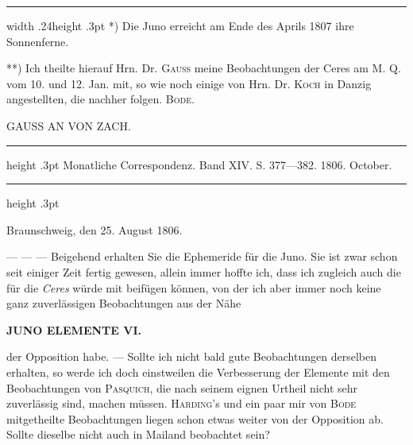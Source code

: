 \par\nobreak\smallskip
\begingroup
\footnotesize
\hrule width .24\linewidth height .3pt\relax
\smallskip
\noindent\hspace*{1.2em}\hypertarget{native-284-note-1}{}*) Die Juno erreicht am Ende des Aprils 1807 ihre Sonnenferne.\par\nobreak
\noindent\hspace*{1.2em}\hypertarget{native-284-note-2}{}**) Ich theilte hierauf Hrn. Dr. \textsc{Gauss} meine Beobachtungen der Ceres am M. Q. vom 10. und 12. Jan. mit, so wie noch einige von Hrn. Dr. \textsc{Koch} in Danzig angestellten, die nachher folgen. \textsc{Bode.}\par
\endgroup

\par\bigskip
{}
\begin{center}
\large GAUSS AN VON ZACH.
\end{center}

\begin{center}
\parbox{.75\linewidth}{%
\centering\fontsize{8.2}{10.2}\selectfont
\hrule height .3pt\relax\vspace{2.5pt}
Monatliche Correspondenz. Band XIV. S. 377—382. 1806. October.\par
\vspace{2.5pt}\hrule height .3pt\relax
}
\end{center}

\begin{flushright}
Braunschweig, den 25. August 1806.
\end{flushright}

\par\indent --- --- --- Beigehend erhalten Sie die Ephemeride für die Juno. Sie ist zwar schon seit einiger Zeit fertig gewesen, allein immer hoffte ich, dass ich zugleich auch die für die \emph{Ceres} würde mit
beifügen können, von der ich aber immer noch keine ganz zuverlässigen Beobachtungen aus der Nähe
\par
\clearpage
\thispagestyle{empty}
\noindent{}%
%
\parbox[t]{\dimexpr\linewidth-24mm\relax}{\centering\footnotesize\bfseries JUNO ELEMENTE VI.\par}%
\makebox[12mm][r]{}\par\nobreak\medskip
\noindent der Opposition habe. --- Sollte ich nicht bald gute Beobachtungen derselben erhalten, so werde ich
doch einstweilen die Verbesserung der Elemente mit den Beobachtungen von \textsc{Pasquich}, die nach seinem
eignen Urtheil nicht sehr zuverlässig sind, machen müssen. \textsc{Harding}'s und ein paar mir von \textsc{Bode} mitgetheilte Beobachtungen liegen schon etwas weiter von der Opposition ab. Sollte dieselbe nicht auch
in Mailand beobachtet sein?

